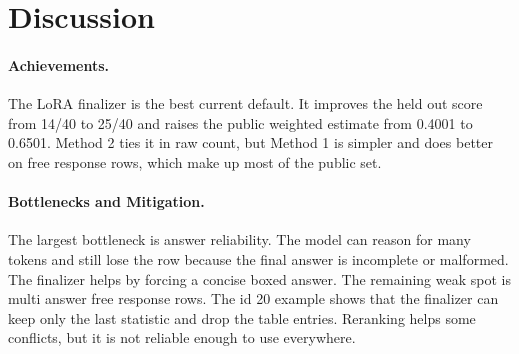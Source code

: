 \documentclass[11pt]{article}
\begin{document}
\begin{table}[H]
\caption{Qualitative examples from the held out set. The table gives final answers or short behavior summaries.}
\centering
{}
\end{table}

\section{Discussion}
\label{sec:discussion}

\paragraph{Achievements.}
The LoRA finalizer is the best current default. It improves the held out score from 14/40 to 25/40 and raises the public weighted estimate from 0.4001 to 0.6501. Method 2 ties it in raw count, but Method 1 is simpler and does better on free response rows, which make up most of the public set.

\paragraph{Bottlenecks and Mitigation.}
The largest bottleneck is answer reliability. The model can reason for many tokens and still lose the row because the final answer is incomplete or malformed. The finalizer helps by forcing a concise boxed answer. The remaining weak spot is multi answer free response rows. The id 20 example shows that the finalizer can keep only the last statistic and drop the table entries. Reranking helps some conflicts, but it is not reliable enough to use everywhere.
\end{document}
